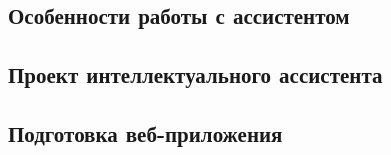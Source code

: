 

\subsection{Особенности работы с ассистентом}



\subsection{Проект интеллектуального ассистента}




\subsection{Подготовка веб-приложения}





